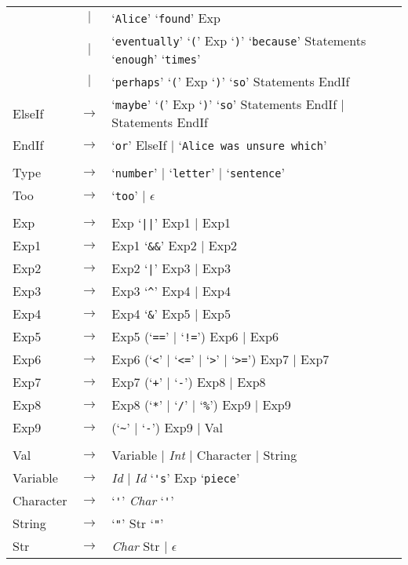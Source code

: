 \documentclass[a4paper,11pt]{article}
\begin{document}
\begin{tabular}{lcl}
            &  $|$  & `\verb:Alice:' `\verb:found:' Exp \\
            &  $|$  & `\verb|eventually|' `\verb|(|' Exp `\verb|)|' `\verb|because|' Statements `\verb|enough|' `\verb|times|' \\
            &  $|$  & `\verb|perhaps|' `\verb|(|' Exp `\verb|)|' `\verb|so|' Statements EndIf \\
ElseIf      & $\to$ & `\verb|maybe|' `\verb|(|' Exp `\verb|)|' `\verb|so|' Statements EndIf $|$ Statements EndIf \\
EndIf       & $\to$ & `\verb|or|' ElseIf $|$ `\verb|Alice was unsure which|' \\
\\
Type        & $\to$ & `\verb|number|' $|$ `\verb|letter|' $|$ `\verb|sentence|' \\
Too         & $\to$ & `\verb|too|' $|$ $\epsilon$ \\
\\
Exp         & $\to$ & Exp `\verb:||:' Exp1 $|$ Exp1 \\
Exp1        & $\to$ & Exp1 `\verb:&&:' Exp2 $|$ Exp2 \\
Exp2        & $\to$ & Exp2 `\verb:|:' Exp3 $|$ Exp3 \\
Exp3        & $\to$ & Exp3 `\verb:^:' Exp4 $|$ Exp4 \\
Exp4        & $\to$ & Exp4 `\verb:&:' Exp5 $|$ Exp5 \\
Exp5        & $\to$ & Exp5 (`\verb:==:' $|$ `\verb:!=:') Exp6 $|$ Exp6 \\
Exp6        & $\to$ & Exp6 (`\verb:<:' $|$ `\verb:<=:' $|$ `\verb:>:' $|$ `\verb:>=:') Exp7 $|$ Exp7 \\
Exp7        & $\to$ & Exp7 (`\verb:+:' $|$ `\verb:-:') Exp8 $|$ Exp8 \\
Exp8        & $\to$ & Exp8 (`\verb:*:' $|$ `\verb:/:' $|$ `\verb:%:') Exp9 $|$ Exp9 \\
Exp9        & $\to$ & (`\verb:~:' $|$ `\verb:-:') Exp9 $|$ Val \\
\\
Val         & $\to$ & Variable $|$ \emph{Int} $|$ Character $|$ String \\
Variable    & $\to$ & \emph{Id} $|$ \emph{Id} `\verb|'s|' Exp `\verb|piece|' \\
Character   & $\to$ & `\verb|'|' \emph{Char} `\verb|'|' \\
String      & $\to$ & `\verb|"|' Str `\verb|"|' \\
Str         & $\to$ & \emph{Char} Str $|$ $\epsilon$ 
\end{tabular}
\end{document}
